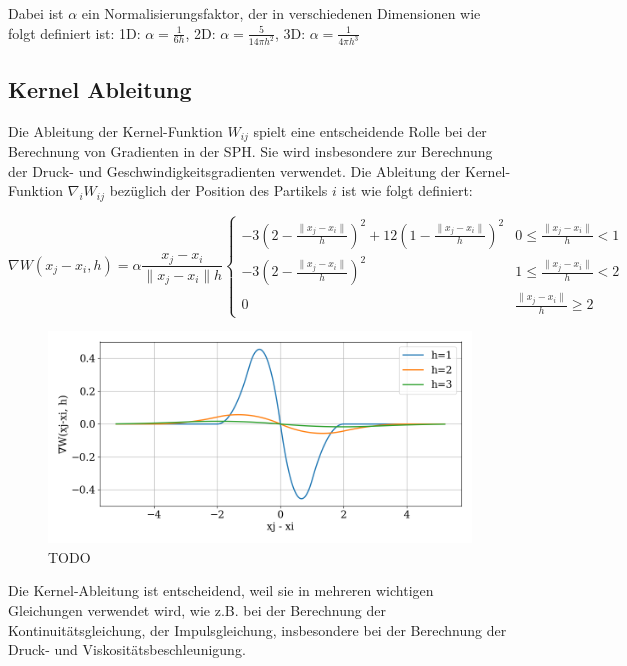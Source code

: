 \documentclass[a4paper, 12pt]{article}
\begin{document}
Dabei ist \(\alpha\) ein Normalisierungsfaktor, der in verschiedenen Dimensionen wie folgt definiert ist:
1D: \(\alpha = \frac{1}{6h}\), 2D: \(\alpha = \frac{5}{14\pi h^2}\), 3D: \(\alpha = \frac{1}{4\pi h^3}\)

\subsection{Kernel Ableitung}
Die Ableitung der Kernel-Funktion $W_{ij}$ spielt eine entscheidende Rolle bei der Berechnung von Gradienten in der SPH. Sie wird insbesondere zur Berechnung der Druck- und Geschwindigkeitsgradienten verwendet. Die Ableitung der Kernel-Funktion $\nabla_i W_{ij}$ bezüglich der Position des Partikels $i$ ist wie folgt definiert:

\begin{equation*}
	\nabla W(x_j - x_i, h) = \alpha \frac{x_j - x_i}{\|x_j - x_i\|h} 
	\begin{cases} 
	-3(2-\frac{\|x_j - x_i\|}{h})^2 + 12(1-\frac{\|x_j - x_i\|}{h})^2 & 0 \leq \frac{\|x_j - x_i\|}{h} < 1 \\ 
	-3(2-\frac{\|x_j - x_i\|}{h})^2 & 1 \leq \frac{\|x_j - x_i\|}{h} < 2 \\ 
	0 & \frac{\|x_j - x_i\|}{h} \geq 2 
	\end{cases}
\end{equation*}	

\begin{figure}[H]
	\centering
	\includegraphics[width=\textwidth]{graphics/KernelDerivPlot.png}
	\caption{TODO}
\end{figure}

Die Kernel-Ableitung ist entscheidend, weil sie in mehreren wichtigen Gleichungen verwendet wird, wie z.B. bei der Berechnung der Kontinuitätsgleichung, der Impulsgleichung, insbesondere bei der Berechnung der Druck- und Viskositätsbeschleunigung.
\end{document}
